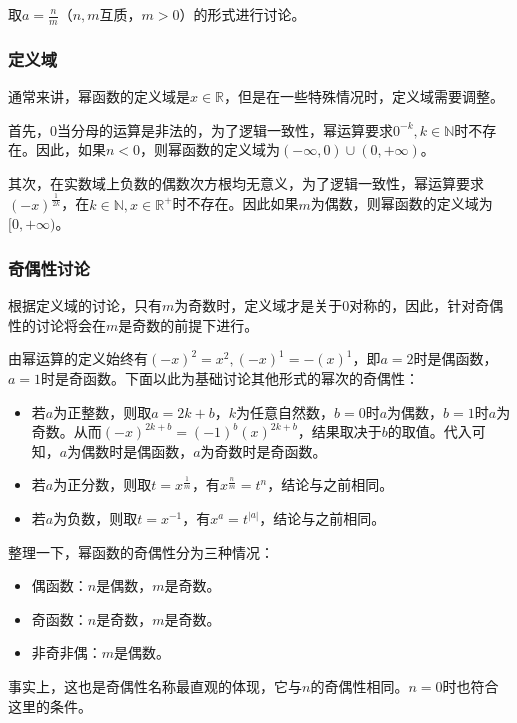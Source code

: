 取$\displaystyle a=\frac{n}{m}$（$n,m$互质，$m>0$）的形式进行讨论。

\subsubsection{定义域}

通常来讲，幂函数的定义域是$x\in\mathbb{R}$，但是在一些特殊情况时，定义域需要调整。

首先，$0$当分母的运算是非法的，为了逻辑一致性，幂运算要求$0^{-k},k\in \mathbb{N}$时不存在。因此，如果$n<0$，则幂函数的定义域为$({-\infty},0)\cup(0,{+\infty})$。

其次，在实数域上负数的偶数次方根均无意义，为了逻辑一致性，幂运算要求$\displaystyle(-x)^\frac{1}{2k}$，在$k\in \mathbb{N},x\in\mathbb{R}^+$时不存在。因此如果${m}$为偶数，则幂函数的定义域为$[0,{+\infty})$。

\subsubsection{奇偶性讨论}

根据定义域的讨论，只有$m$为奇数时，定义域才是关于$0$对称的，因此，针对奇偶性的讨论将会在$m$是奇数的前提下进行。

由幂运算的定义始终有$(-x)^2=x^2,(-x)^1=-(x)^1$，即$a=2$时是偶函数，$a=1$时是奇函数。下面以此为基础讨论其他形式的幂次的奇偶性：

\begin{itemize}
\item 若$a$为正整数，则取$a=2k+b$，$k$为任意自然数，$b=0$时$a$为偶数，$b=1$时$a$为奇数。从而$(-x)^{2k+b}=(-1)^b(x)^{2k+b}$，结果取决于$b$的取值。代入可知，$a$为偶数时是偶函数，$a$为奇数时是奇函数。
\item 若$a$为正分数，则取$t=x^\frac{1}{m}$，有$x^\frac{n}{m}=t^{n}$，结论与之前相同。
\item 若$a$为负数，则取$t=x^{-1}$，有$x^a=t^{|a|}$，结论与之前相同。
\end{itemize}

整理一下，幂函数的奇偶性分为三种情况：

\begin{itemize}
\item 偶函数：$n$是偶数，$m$是奇数。
\item 奇函数：$n$是奇数，$m$是奇数。
\item 非奇非偶：$m$是偶数。
\end{itemize}

事实上，这也是奇偶性名称最直观的体现，它与$n$的奇偶性相同。$n=0$时也符合这里的条件。

